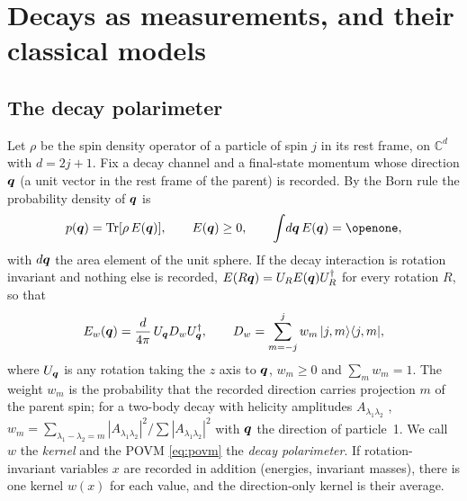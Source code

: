\section{Decays as measurements, and their classical models}
\label{sec:setting}

\subsection{The decay polarimeter}
\label{sec:polarimeter}

Let $\rho$ be the spin density operator of a particle of spin $j$ in its rest frame, on $\mathbb{C}^d$ with $d=2j+1$. Fix a decay channel and a final-state momentum whose direction $\bm{q}$ (a unit vector in the rest frame of the parent) is recorded. By the Born rule the probability density of $\bm{q}$ is
\begin{equation}
p(\bq)=\Tr[\rho\,E(\bq)],\qquad E(\bq)\ge0,\qquad \int\! d\bq\,E(\bq)=\openone ,
\label{eq:born}
\end{equation}
with $d\bm{q}$ the area element of the unit sphere. If the decay interaction is rotation invariant and nothing else is recorded, $E(R\bm{q})=U_RE(\bm{q})U_R^\dagger$ for every rotation $R$, so that
\begin{equation}
E_w(\bm{q})=\frac{d}{4\pi}\,U_{\bm{q}}D_wU_{\bm{q}}^\dagger,\qquad D_w=\sum_{m=-j}^{j}w_m\,|j,m\rangle\langle j,m| ,
\label{eq:povm}
\end{equation}
where $U_{\bm{q}}$ is any rotation taking the $z$ axis to $\bm{q}$, $w_m\ge0$ and $\sum_mw_m=1$. The weight $w_m$ is the probability that the recorded direction carries projection $m$ of the parent spin; for a two-body decay with helicity amplitudes $A_{\lambda_1\lambda_2}$ \cite{jacob1959}, $w_m=\sum_{\lambda_1-\lambda_2=m}|A_{\lambda_1\lambda_2}|^2/\sum|A_{\lambda_1\lambda_2}|^2$ with $\bm{q}$ the direction of particle~1. We call $w$ the \emph{kernel} and the POVM \eqref{eq:povm} the \emph{decay polarimeter}. If rotation-invariant variables $x$ are recorded in addition (energies, invariant masses), there is one kernel $w(x)$ for each value, and the direction-only kernel is their average.

